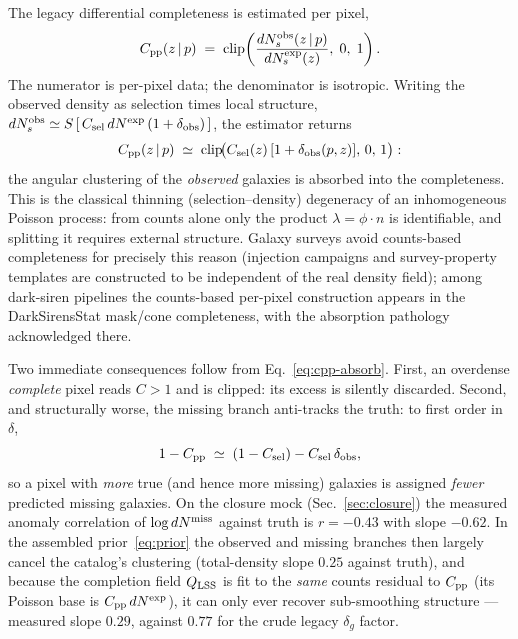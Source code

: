 \documentclass[11pt]{article}
\newcommand{\dNobs}{dN^{\rm obs}_{s}}
\newcommand{\dNexp}{dN^{\rm exp}}
\newcommand{\dNexps}{dN^{\rm exp}_{s}}
\newcommand{\dNmiss}{dN^{\rm miss}}
\newcommand{\Qlss}{Q_{\rm LSS}}
\begin{document}
The legacy differential completeness is estimated per pixel,
\begin{equation}
C_{\rm pp}(z\,|\,p) \;=\;
\mathrm{clip}\!\left(\frac{\dNobs(z\,|\,p)}{\dNexps(z)},\; 0,\; 1\right).
\label{eq:cpp}
\end{equation}
The numerator is per-pixel data; the denominator is isotropic. Writing the observed
density as selection times local structure,
$\dNobs \simeq S\,[\,C_{\rm sel}\,\dNexp\,(1+\delta_{\rm obs})\,]$, the estimator
returns
\begin{equation}
C_{\rm pp}(z\,|\,p) \;\simeq\;
\mathrm{clip}\!\bigl( C_{\rm sel}(z)\,[1+\delta_{\rm obs}(p,z)],\, 0,\, 1 \bigr):
\label{eq:cpp-absorb}
\end{equation}
the angular clustering of the \emph{observed} galaxies is absorbed into the
completeness. This is the classical thinning (selection--density) degeneracy of an
inhomogeneous Poisson process: from counts alone only the product
$\lambda = \phi \cdot n$ is identifiable, and splitting it requires external
structure. Galaxy surveys avoid counts-based completeness for precisely this reason
(injection campaigns and survey-property templates are constructed to be independent
of the real density field); among dark-siren pipelines the counts-based per-pixel
construction appears in the DarkSirensStat mask/cone completeness, with the
absorption pathology acknowledged there.

Two immediate consequences follow from Eq.~\eqref{eq:cpp-absorb}. First, an overdense
\emph{complete} pixel reads $C > 1$ and is clipped: its excess is silently discarded.
Second, and structurally worse, the missing branch anti-tracks the truth: to first
order in $\delta$,
\begin{equation}
1 - C_{\rm pp} \;\simeq\; (1 - C_{\rm sel}) - C_{\rm sel}\,\delta_{\rm obs},
\end{equation}
so a pixel with \emph{more} true (and hence more missing) galaxies is assigned
\emph{fewer} predicted missing galaxies. On the closure mock (Sec.~\ref{sec:closure})
the measured anomaly correlation of $\log \dNmiss$ against truth is $r = -0.43$ with
slope $-0.62$. In the assembled prior~\eqref{eq:prior} the observed and missing
branches then largely cancel the catalog's clustering (total-density slope $0.25$
against truth), and because the completion field $\Qlss$ is fit to the \emph{same}
counts residual to $C_{\rm pp}$ (its Poisson base is $C_{\rm pp}\,\dNexp$), it can
only ever recover sub-smoothing structure --- measured slope $0.29$, against $0.77$
for the crude legacy $\delta_g$ factor.
\end{document}
